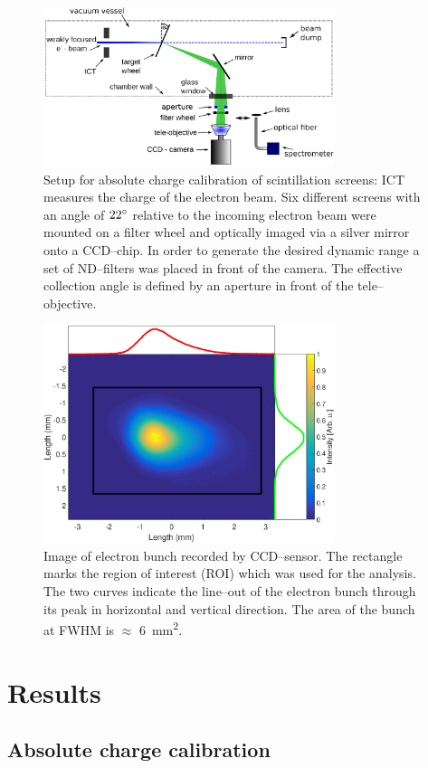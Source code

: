 \documentclass[%
preprint,
amsmath,
amssymb,
aip,
rsi, 
numerical,
floatfix,
]{revtex4-1}
\begin{document}
 
\begin{figure}
\includegraphics[width=8.5cm]{./Figures/Setup_V4}%
\caption{\label{fig:Setup}Setup for absolute charge calibration of scintillation screens: ICT measures the charge of the electron beam. 
Six different screens with an angle of $22\degree$ relative to the incoming electron beam were mounted on a filter wheel and optically imaged via a silver mirror onto a CCD--chip.
In order to generate the desired dynamic range a set of ND--filters was placed in front of the camera.
The effective collection angle is defined by an aperture in front of the tele--objective.}
\end{figure}
\begin{figure}
\includegraphics[width=8.5cm]{./Figures/electron_bunch_V2}%
\caption{\label{fig:electron_bunch}
Image of electron bunch recorded by CCD–sensor. 
The rectangle marks the region of interest (ROI) which was used for the analysis. 
The two curves indicate the line--out of the electron bunch through its peak in horizontal and vertical direction. 
The area of the bunch at FWHM is $\approx$ \SI{6}{\square\milli\meter}.}
\end{figure}

\section{\label{Res} Results}
\subsection{\label{Ac} Absolute charge calibration}
\end{document}
